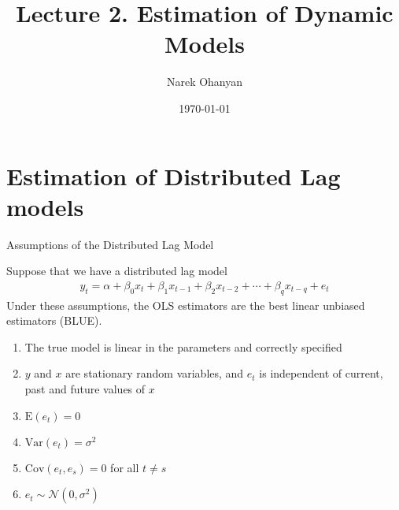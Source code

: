 \documentclass[10pt,aspectratio=169]{beamer}  %
\author[Narek Ohanyan]{Narek Ohanyan}
\title[Estimation of Dynamic Models]{Lecture 2. Estimation of Dynamic Models}
\institute[AUA]{American University of Armenia}
\date{\today}
\begin{document}
\begin{frame}
    \titlepage
\end{frame}


\section{Estimation of Distributed Lag models}


\begin{frame}{Assumptions of the Distributed Lag Model}

    \bigskip
    Suppose that we have a distributed lag model
    \begin{align*}
        y_{t} = \alpha + \beta_{0} x_{t} + \beta_{1} x_{t-1} + \beta_{2} x_{t-2} + \cdots + \beta_{q} x_{t-q} + e_{t}
    \end{align*}
    Under these assumptions, the OLS estimators are the best linear unbiased estimators (BLUE).

    \smallskip
    \begin{tcolorbox}[colframe=MyColor!80, title=Assumptions of the Distributed Lag model]
        \begin{enumerate}
            \item The true model is linear in the parameters and correctly specified
            \item $ y $ and $ x $ are stationary random variables, and $ e_{t} $ is independent of current, past and future values of $ x $
            \item $ \mathrm{E}(e_{t}) = 0 $
            \item $ \mathrm{Var}(e_{t}) = \sigma^2 $
            \item $ \mathrm{Cov}(e_{t}, e_{s}) = 0 $ for all $ t \neq s $
            \item $ e_{t} \sim \mathcal{N}(0, \sigma^2) $
        \end{enumerate}
    \end{tcolorbox}

\end{frame}

\end{document}
